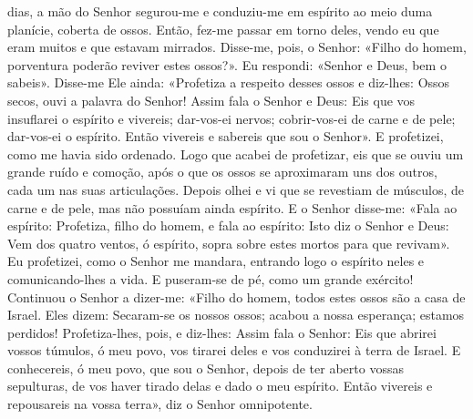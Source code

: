 \begin{paracol}{2}
{ dias, a mão do Senhor segurou-me e conduziu-me em espírito ao meio duma planície, coberta de ossos. Então, fez-me passar em torno deles, vendo eu que eram muitos e que estavam mirrados. Disse-me, pois, o Senhor: «Filho do homem, porventura poderão reviver estes ossos?». Eu respondi: «Senhor e Deus, bem o sabeis». Disse-me Ele ainda: «Profetiza a respeito desses ossos e diz-lhes: Ossos secos, ouvi a palavra do Senhor! Assim fala o Senhor e Deus: Eis que vos insuflarei o espírito e vivereis; dar-vos-ei nervos; cobrir-vos-ei de carne e de pele; dar-vos-ei o espírito. Então vivereis e sabereis que sou o Senhor». E profetizei, como me havia sido ordenado. Logo que acabei de profetizar, eis que se ouviu um grande ruído e comoção, após o que os ossos se aproximaram uns dos outros, cada um nas suas articulações. Depois olhei e vi que se revestiam de músculos, de carne e de pele, mas não possuíam ainda espírito. E o Senhor disse-me: «Fala ao espírito: Profetiza, filho do homem, e fala ao espírito: Isto diz o Senhor e Deus: Vem dos quatro ventos, ó espírito, sopra sobre estes mortos para que revivam». Eu profetizei, como o Senhor me mandara, entrando logo o espírito neles e comunicando-lhes a vida. E puseram-se de pé, como um grande exército! Continuou o Senhor a dizer-me: «Filho do homem, todos estes ossos são a casa de Israel. Eles dizem: Secaram-se os nossos ossos; acabou a nossa esperança; estamos perdidos! Profetiza-lhes, pois, e diz-lhes: Assim fala o Senhor: Eis que abrirei vossos túmulos, ó meu povo, vos tirarei deles e vos conduzirei à terra de Israel. E conhecereis, ó meu povo, que sou o Senhor, depois de ter aberto vossas sepulturas, de vos haver tirado delas e dado o meu espírito. Então vivereis e repousareis na vossa terra», diz o Senhor omnipotente.
}\switchcolumn*{}\switchcolumn{}\switchcolumn*{}\switchcolumn{}\switchcolumn*{}\switchcolumn{}\switchcolumn*{}\switchcolumn{}\end{paracol}

